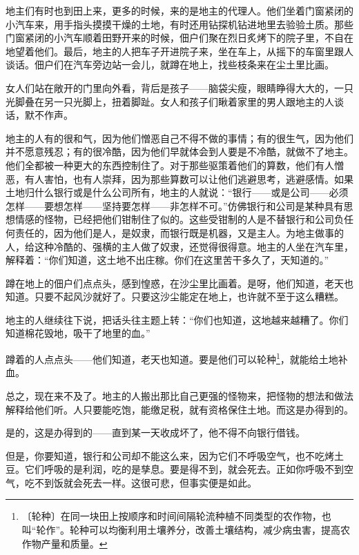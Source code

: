 \documentclass[12pt,UTF-8,openany]{ctexbook}
\begin{document}
\begin{large}
    
    地主们有时也到田上来，更多的时候，来的是地主的代理人。他们坐着门窗紧闭的小汽车来，用手指头摸摸干燥的土地，有时还用钻探机钻进地里去验验土质。那些门窗紧闭的小汽车顺着田野开来的时候，佃户们聚在烈日炙烤下的院子里，不自在地望着他们。最后，地主的人把车子开进院子来，坐在车上，从摇下的车窗里跟人谈话。佃户们在汽车旁边站一会儿，就蹲在地上，找些枝条来在尘土里比画。
    
    女人们站在敞开的门里向外看，背后是孩子——脑袋尖瘦，眼睛睁得大大的，一只光脚叠在另一只光脚上，扭着脚趾。女人和孩子们瞅着家里的男人跟地主的人谈话，默不作声。
    
    地主的人有的很和气，因为他们憎恶自己不得不做的事情；有的很生气，因为他们并不愿意残忍；有的很冷酷，因为他们早就体会到人要是不冷酷，就做不了地主。他们全都被一种更大的东西控制住了。对于那些驱策着他们的算数，他们有人憎恶，有人害怕，也有人崇拜，因为那些算数可以让他们逃避思考，逃避感情。如果土地归什么银行或是什么公司所有，地主的人就说：“银行——或是公司——必须怎样——要想怎样——坚持要怎样——非怎样不可。”仿佛银行和公司是某种具有思想情感的怪物，已经把他们钳制住了似的。这些受钳制的人是不替银行和公司负任何责任的，因为他们是人，是奴隶，而银行既是机器，又是主人。为地主做事的人，给这种冷酷的、强横的主人做了奴隶，还觉得很得意。地主的人坐在汽车里，解释着：“你们知道，这土地不出庄稼。你们在这里苦干多久了，天知道的。”
    
    蹲在地上的佃户们点点头，感到惶惑，在沙尘里比画着。是呀，他们知道，老天也知道。只要不起风沙就好了。只要这沙尘能定在地上，也许就不至于这么糟糕。
    
    地主的人继续往下说，把话头往主题上转：“你们也知道，这地越来越糟了。你们知道棉花毁地，吸干了地里的血。”
    
    蹲着的人点点头——他们知道，老天也知道。要是他们可以轮种\footnote{〔轮种〕在同一块田上按顺序和时间间隔轮流种植不同类型的农作物，也叫“轮作”。轮种可以均衡利用土壤养分，改善土壤结构，减少病虫害，提高农作物产量和质量。}，就能给土地补血。
    
    总之，现在来不及了。地主的人搬出那比自己更强的怪物来，把怪物的想法和做法解释给他们听。人只要能吃饱，能缴足税，就有资格保住土地。而这是办得到的。
    
    是的，这是办得到的——直到某一天收成坏了，他不得不向银行借钱。
    
    但是，你要知道，银行和公司却不能这么来，因为它们不呼吸空气，也不吃烤土豆。它们呼吸的是利润，吃的是孳息。要是得不到，就会死去。正如你呼吸不到空气，吃不到饭就会死去一样。这很可悲，但事实便是如此。
    

\end{large}
\end{document}
